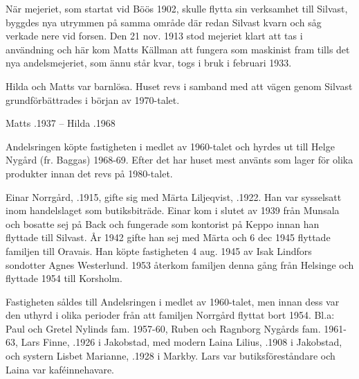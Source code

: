 När mejeriet, som startat vid Böös 1902, skulle flytta sin verksamhet till Silvast, byggdes nya utrymmen på samma område där redan Silvast kvarn och såg verkade nere vid forsen. Den 21 nov. 1913 stod mejeriet klart att tas i användning och här kom Matts Källman att fungera som maskinist fram tills det nya andelsmejeriet, som ännu står kvar, togs i bruk i februari 1933.

Hilda och Matts var barnlösa. Huset revs i samband med att vägen genom Silvast grundförbättrades i början av 1970-talet.

Matts .1937  --  Hilda .1968





Andelsringen köpte fastigheten i medlet av 1960-talet och hyrdes ut till Helge Nygård (fr. Baggas) 1968-69. Efter det har huset mest använts som lager för olika produkter innan det revs på 1980-talet.


Einar Norrgård, .1915, gifte sig med Märta Liljeqvist, .1922. Han var sysselsatt inom handelslaget som butiksbiträde. Einar kom i slutet av 1939 från Munsala och bosatte sej på Back och fungerade som kontorist på Keppo innan han flyttade till Silvast. År 1942 gifte han sej med Märta och 6 dec 1945 flyttade familjen till Oravais. Han köpte fastigheten 4 aug. 1945 av Isak Lindfors sondotter Agnes Westerlund. 1953 återkom familjen denna gång från Helsinge och flyttade 1954 till Korsholm.
\begin{jhchildren}
  \item {}
  \item {}
  \item {}
\end{jhchildren}

Fastigheten såldes till Andelsringen i medlet av 1960-talet, men innan dess var den uthyrd i olika perioder från att familjen Norrgård flyttat bort 1954. Bl.a: Paul och Gretel Nylinds fam. 1957-60, Ruben och Ragnborg Nygårds fam. 1961-63, Lars Finne, .1926 i Jakobstad, med modern Laina Lilius, .1908 i Jakobstad, och systern Lisbet Marianne, .1928 i Markby. Lars var butiksföreståndare och Laina var kaféinnehavare.

